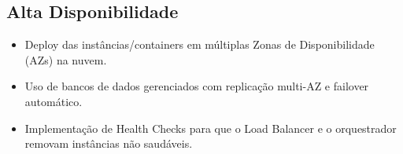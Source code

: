 \subsection{Alta Disponibilidade}
\label{subsec:alta-disponibilidade}
\begin{itemize}
    \item Deploy das instâncias/containers em múltiplas Zonas de Disponibilidade (AZs) na nuvem.
    \item Uso de bancos de dados gerenciados com replicação multi-AZ e failover automático.
    \item Implementação de Health Checks para que o Load Balancer e o orquestrador removam instâncias não saudáveis.
\end{itemize}

